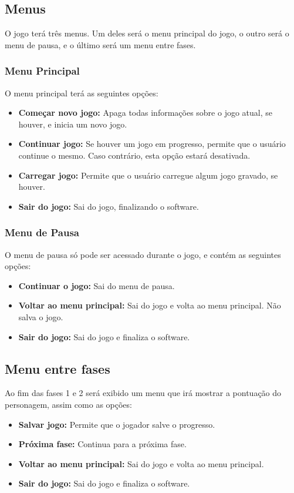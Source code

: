\subsection{Menus}

O jogo terá três menus. Um deles será o menu principal do jogo, o 
outro será o menu de pausa, e o último será um menu entre fases.

\subsubsection{Menu Principal}

O menu principal terá as seguintes opções:
\begin{itemize}
 \item {\bf Começar novo jogo:} Apaga todas informações sobre o jogo atual,
se houver, e inicia um novo jogo.
 \item {\bf Continuar jogo:} Se houver um jogo em progresso, permite que
o usuário continue o mesmo. Caso contrário, esta opção estará desativada.
 \item {\bf Carregar jogo:} Permite que o usuário carregue algum jogo
gravado, se houver.
 \item {\bf Sair do jogo:} Sai do jogo, finalizando o software.
\end{itemize}

\subsubsection{Menu de Pausa}
O menu de pausa só pode ser acessado durante o jogo, e contém as seguintes
opções:
\begin{itemize}
 \item {\bf Continuar o jogo:} Sai do menu de pausa.
 \item {\bf Voltar ao menu principal:} Sai do jogo e volta ao menu 
principal. Não salva o jogo.
 \item {\bf Sair do jogo:} Sai do jogo e finaliza o software.
\end{itemize}

\subsection{Menu entre fases}
Ao fim das fases 1 e 2 será exibido um menu que irá mostrar a pontuação do
personagem, assim como as opções:
\begin{itemize}
 \item {\bf Salvar jogo:} Permite que o jogador salve o progresso.
 \item {\bf Próxima fase:} Continua para a próxima fase.
 \item {\bf Voltar ao menu principal:} Sai do jogo e volta ao menu principal.
 \item {\bf Sair do jogo:} Sai do jogo e finaliza o software.
\end{itemize}
